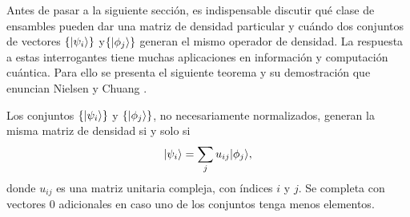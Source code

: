 \begin{comment}
	\begin{equation*}
		\begin{split}
			\rho^2&=\sum_{i,j} p_i p_j|\psi_i\rala \psi_i|\psi_j\rala \psi_j|\\
			&=\sum_{i,j} p_i p_j|\psi_i \rala \psi_j|\delta_{ij}\\
			&=\sum_i p_i^2|\psi_i \rala \psi_i|.
			\end{split}
	\end{equation*}
Luego se obtiene la pureza, \[\tr(\rho^2)=\tr{\left(\sum_i p_i^2|\psi_i \rala \psi_i|\right)}=\sum_i p_i^2 \tr(|\psi_i \rala\psi_i|)=\sum_i p_i^2.\]
	
Ahora, dado que $p_i^2 \le p_i $ puesto que $0 \le p_i \le 1$. Luego, se tiene \[\sum_i p_i^2\le\sum_i p_i=1.\]
	
Suponiendo que $\tr(\rho^2)=1$, entonces $\sum_i p_i^{2}=1$. Para $0<p_i<1$ se tiene que  $p_i^2<p_i$ y solamente una $p_i$ debe ser 1. Por lo tanto, $\rho=|\psi_i\rala\psi_i|$ es un estado puro.
	 
Por otro lado, suponiendo que $\rho
$ es puro, $\rho=|\psi\rala \psi|$
\[\tr(\rho^2)=\tr(|\psi\rala \psi|\psi\rala \psi|)=\tr(|\psi\rala
\psi|)=\la\psi|\psi\ra=1.\]
Por otro lado, si $\rho $ es mixto, luego $\rho=\sum_i
p_i|\psi_i\rangle \langle \psi_i|$, con todo $p_i<1$ \[\tr(\rho^2)=\sum_i p_i^2
\tr(|\psi_i \rala\psi_i|)=\sum_i p_i^2<\sum_i p_i=1.\]
	\end{proof}

\end{comment}

Antes de pasar a la siguiente sección, es indispensable discutir qué clase de
ensambles pueden dar una matriz de densidad particular y cuándo dos conjuntos
de vectores $\{|\psi_i\rangle\}$ y$ \{|\phi_j\rangle \}$ generan el mismo operador de
densidad. La respuesta a estas interrogantes tiene muchas aplicaciones en
información y computación cuántica. Para ello se presenta el siguiente
teorema y su demostración que enuncian Nielsen y Chuang
{\cite{nielsen_chuang_2010}}. 
\begin{theorem}
Los conjuntos $\{|\psi_i\rangle\}$ y $ \{|\phi_j\rangle \}$, no necesariamente
normalizados, generan la misma matriz de densidad si y solo si
\begin{equation}\label{teorema2.4}
|\psi_i\rangle= \sum_{j}u_{ij}|\phi_j\rangle,
\end{equation} donde $u_{ij}$ es una matriz unitaria compleja, con índices $i$ y $j$. Se completa con vectores 0 adicionales en caso uno de los conjuntos tenga menos elementos.
\end{theorem}

